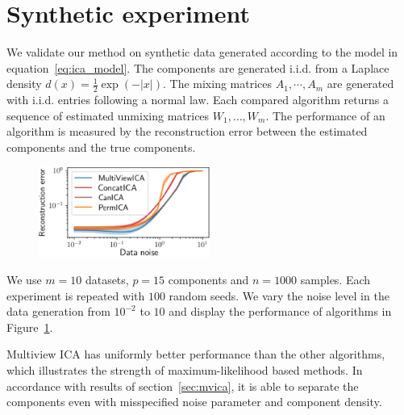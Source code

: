 \section{Synthetic experiment}

We validate our method on synthetic data generated according to the model in equation~\eqref{eq:ica_model}.
%
The components are generated i.i.d. from a Laplace density $d(x)=\frac12\exp(-|x|)$.
%
The mixing matrices $A_1,\cdots, A_m$ are generated with i.i.d. entries following a normal law.
Each compared algorithm returns a sequence of estimated unmixing matrices $W_1, \dots, W_m$.
%
The performance of an algorithm is measured by the reconstruction error between the estimated components and the true components.

\begin{figure}
  \includegraphics[width=0.5\textwidth]{figures/mvica/distance_expe.pdf}
  \label{fig:mvica:synth}
\end{figure}

%
%
We use $m=10$ datasets, $p=15$ components and $n=1000$ samples. Each experiment is repeated with $100$ random seeds.
%
We vary the noise level in the data generation from $10^{-2}$ to $10$ and
display the performance of algorithms in Figure~\ref{fig:mvica:synth}.

Multiview ICA has uniformly better performance than the other algorithms, which illustrates the strength of maximum-likelihood based methods. In accordance with results of section~\ref{sec:mvica}, it is able to separate the components even with misspecified noise parameter and component density.
%


